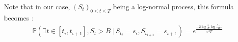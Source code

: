 \documentclass[a4paper,11pt,english]{book}
\begin{document}
Note that in our case, $(S_t)_{0 \leq t \leq T}$ being a log-normal process, this formula becomes :
$$\begin{aligned}
\mathbb{P}(\exists t \in [t_i,t_{i+1}],S_t>B~|~S_{t_i}=s_i,S_{t_{i+1}}=s_{i+1}) = e^{\frac{-2\log{\frac{s_i}{B}}\log{\frac{s_{i+1}}{B}}}{\sigma^2 T}}
\end{aligned}$$

\endgroup
\end{document}
